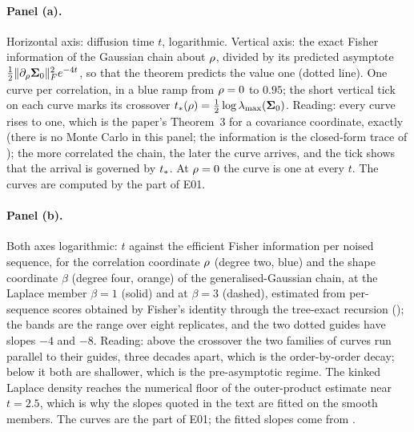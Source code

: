 \paragraph{Panel (a).} Horizontal axis: diffusion time $t$, logarithmic. Vertical
axis: the exact Fisher information of the Gaussian chain about $\rho$, divided by its
predicted asymptote $\tfrac12\lVert \partial_\rho\mathbf{\Sigma}_0 \rVert_{F}^2e^{-4t}$, so that the theorem
predicts the value one (dotted line). One curve per correlation, in a blue ramp from
$\rho=0$ to $0.95$; the short vertical tick on each curve marks its crossover
$t_{*}(\rho)=\tfrac12\log\lambda_{\max}(\mathbf{\Sigma}_0)$. Reading: every curve rises to one, which is
the paper's Theorem~3 for a covariance coordinate, exactly (there is no Monte Carlo in
this panel; the information is the closed-form trace of
); the more correlated the chain, the later the curve
arrives, and the tick shows that the arrival is governed by $t_{*}$. At $\rho=0$ the
curve is one at every $t$. The curves are computed by the  part of E01.

\paragraph{Panel (b).} Both axes logarithmic: $t$ against the efficient Fisher information
per noised sequence, for the correlation coordinate $\rho$ (degree two, blue) and the
shape coordinate $\beta$ (degree four, orange) of the generalised-Gaussian chain, at the
Laplace member $\beta=1$ (solid) and at $\beta=3$ (dashed), estimated from
per-sequence scores obtained by Fisher's identity through the tree-exact recursion
(); the bands are the range over eight replicates, and the
two dotted guides have slopes $-4$ and $-8$. Reading: above the crossover the two
families of curves run parallel to their guides, three decades apart, which is the
order-by-order decay; below it both are shallower, which is the pre-asymptotic regime.
The kinked Laplace density reaches the numerical floor of the outer-product estimate near
$t=2.5$, which is why the slopes quoted in the text are fitted on the smooth members.
The curves are the  part of E01; the fitted slopes come from
.

